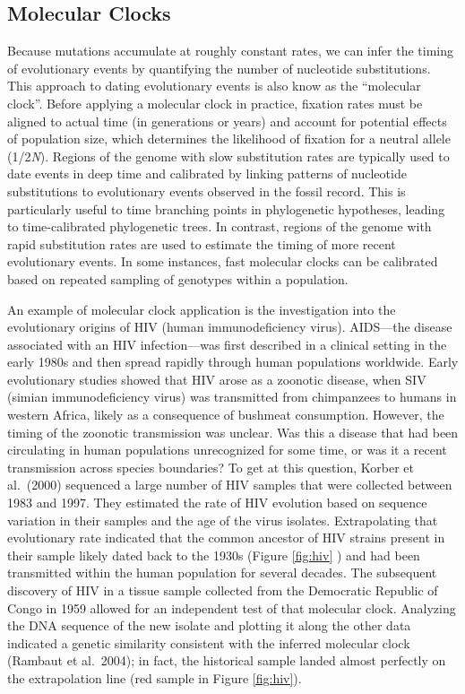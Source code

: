 \documentclass[
]{book}
\begin{document}
\hypertarget{molecular-clocks}{%
\subsection{Molecular Clocks}\label{molecular-clocks}}

Because mutations accumulate at roughly constant rates, we can infer the timing of evolutionary events by quantifying the number of nucleotide substitutions. This approach to dating evolutionary events is also know as the ``molecular clock''. Before applying a molecular clock in practice, fixation rates must be aligned to actual time (in generations or years) and account for potential effects of population size, which determines the likelihood of fixation for a neutral allele (1/2\emph{N}). Regions of the genome with slow substitution rates are typically used to date events in deep time and calibrated by linking patterns of nucleotide substitutions to evolutionary events observed in the fossil record. This is particularly useful to time branching points in phylogenetic hypotheses, leading to time-calibrated phylogenetic trees. In contrast, regions of the genome with rapid substitution rates are used to estimate the timing of more recent evolutionary events. In some instances, fast molecular clocks can be calibrated based on repeated sampling of genotypes within a population.

An example of molecular clock application is the investigation into the evolutionary origins of HIV (human immunodeficiency virus). AIDS---the disease associated with an HIV infection---was first described in a clinical setting in the early 1980s and then spread rapidly through human populations worldwide. Early evolutionary studies showed that HIV arose as a zoonotic disease, when SIV (simian immunodeficiency virus) was transmitted from chimpanzees to humans in western Africa, likely as a consequence of bushmeat consumption. However, the timing of the zoonotic transmission was unclear. Was this a disease that had been circulating in human populations unrecognized for some time, or was it a recent transmission across species boundaries? To get at this question, Korber et al.~(2000) sequenced a large number of HIV samples that were collected between 1983 and 1997. They estimated the rate of HIV evolution based on sequence variation in their samples and the age of the virus isolates. Extrapolating that evolutionary rate indicated that the common ancestor of HIV strains present in their sample likely dated back to the 1930s (Figure \ref{fig:hiv} ) and had been transmitted within the human population for several decades. The subsequent discovery of HIV in a tissue sample collected from the Democratic Republic of Congo in 1959 allowed for an independent test of that molecular clock. Analyzing the DNA sequence of the new isolate and plotting it along the other data indicated a genetic similarity consistent with the inferred molecular clock (Rambaut et al.~2004); in fact, the historical sample landed almost perfectly on the extrapolation line (red sample in Figure \ref{fig:hiv}).
\end{document}
